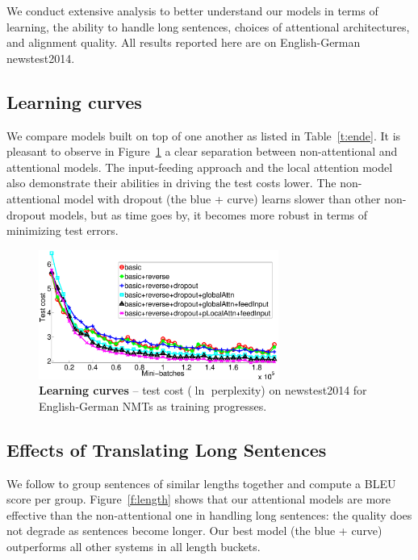 We conduct extensive analysis to better understand our models in terms
of learning, the ability to handle long sentences, 
choices of attentional architectures, and alignment quality. All results
reported here are on English-German newstest2014.

\subsection{Learning curves}
We compare models built on top of one another %
as listed in Table~\ref{t:ende}. It is
pleasant to observe in Figure~\ref{f:learn} a clear separation between non-attentional and attentional
models. The input-feeding approach and the local attention
model also demonstrate their abilities in driving the test costs lower. The
non-attentional model with 
dropout (the blue + curve) learns slower than other non-dropout models, but
as time goes by, it becomes more robust in terms of minimizing test errors.
\begin{figure}
\centering
\includegraphics[width=0.7\textwidth, clip=true, trim=140 0 70 0]{img/4-learning} %
\caption[Learning curves]{{\bf Learning curves} -- test cost ($\ln$ perplexity) on newstest2014 for English-German NMTs as training progresses.
} 
\label{f:learn}
\end{figure}

\subsection{Effects of Translating Long Sentences}
We follow \cite{bog15} to group sentences of similar lengths together and
compute a BLEU score per group. Figure~\ref{f:length} shows that
our attentional models are more effective than the non-attentional one in
handling long sentences: the quality does not degrade as sentences
become longer. Our best model (the blue + curve) outperforms all other systems in all length buckets.

